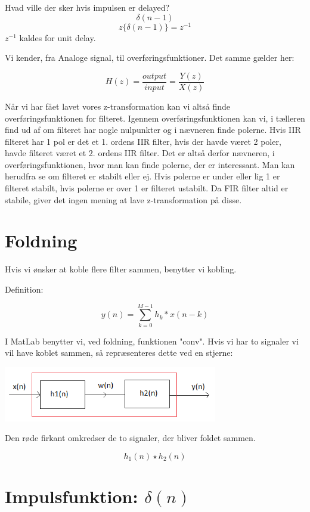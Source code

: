 \documentclass[12pt, letterpaper]{article}
\begin{document}
Hvad ville der sker hvis impulsen er delayed? 
$$\delta(n-1)$$
$$ z{\{\delta(n-1)}\}=z^{-1}$$
$z^{-1}$ kaldes for unit delay. 

Vi kender, fra Analoge signal, til overføringsfunktioner. Det samme gælder her: 

$$ H(z)= \frac{output}{input} = \frac{Y(z)}{X(z)}$$

Når vi har fået lavet vores z-transformation kan vi altså finde overføringsfunktionen for filteret. 
Igennem overføringsfunktionen kan vi, i tælleren find ud af om filteret har nogle nulpunkter og i nævneren finde polerne. 
Hvis IIR filteret har 1 pol er det et 1. ordens IIR filter, hvis der havde været 2 poler, havde filteret været et 2. ordens IIR filter. Det er altså derfor nævneren, i overføringsfunktionen, hvor man kan finde polerne, der er interessant. Man kan herudfra se om filteret er stabilt eller ej. Hvis polerne er under eller lig 1 er filteret stabilt, hvis polerne er over 1 er filteret ustabilt. 
Da FIR filter altid er stabile, giver det ingen mening at lave z-transformation på disse. 


\section{Foldning}
Hvis vi ønsker at koble flere filter sammen, benytter vi kobling. 

Definition: 

$$ y(n)= \sum\limits_{k=0}^{M-1} h_k * x(n-k) $$

I MatLab benytter vi, ved foldning, funktionen "conv". 
Hvis vi har to signaler vi vil have koblet sammen, så repræsenteres dette ved en stjerne: 

\begin{center}
\includegraphics[width=0.7\textwidth]{billeder/foldning}
\end{center}

Den røde firkant omkredser de to signaler, der bliver foldet sammen. 

$$ h_1(n)\star h_2(n) $$


\section{Impulsfunktion: $\delta(n)$}
\end{document}
